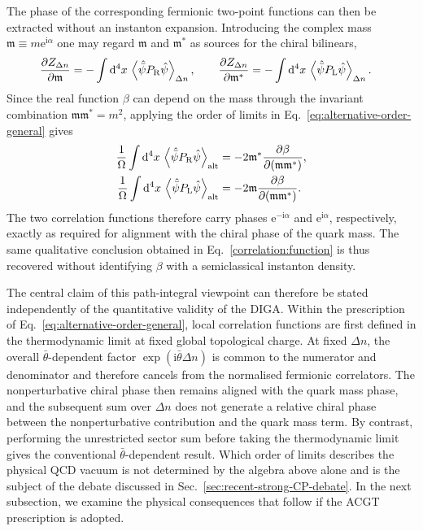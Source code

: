 \documentclass[review]{elsarticle}
\numberwithin{equation}{section}
\numberwithin{table}{section}
\numberwithin{figure}{section}
\def\d{\mathrm{d}}
\def\i{\mathrm{i}}
\def\e{\mathrm{e}}
\begin{document}
The phase of the corresponding fermionic two-point functions can then be extracted without an instanton expansion. Introducing the complex mass $\mathfrak m\equiv
m\e^{\i\alpha}$ one may regard $\mathfrak m$ and $\mathfrak m^*$ as sources for the chiral bilinears,
\begin{align}
    \frac{\partial Z_{\Delta n}}
         {\partial\mathfrak m}
    &=
    -\int\d^4x\,
    \left\langle
        \hat{\bar\psi}P_{\rm R}\hat\psi
    \right\rangle_{\Delta n},
    \qquad
    \frac{\partial Z_{\Delta n}}
         {\partial\mathfrak m^*}
    =
    -\int\d^4x\,
    \left\langle
        \hat{\bar\psi}P_{\rm L}\hat\psi
    \right\rangle_{\Delta n}.
    \label{eq:mass-source-chiral-condensates}
\end{align}
Since the real function $\beta$ can depend on the mass through the invariant combination $\mathfrak m\mathfrak m^*=m^2$, applying the order of limits in Eq.~\eqref{eq:alternative-order-general} gives~\cite{Ai:2020ptm}
\begin{align}
    \frac{1}{\Omega}
    \int\d^4x\,
    \left\langle
        \hat{\bar\psi}P_{\rm R}\hat\psi
    \right\rangle_{\rm alt}
    &=
    -2\mathfrak m^*
    \frac{\partial\beta}
         {\partial(\mathfrak m\mathfrak m^*)},
    \notag\\
    \frac{1}{\Omega}
    \int\d^4x\,
    \left\langle
        \hat{\bar\psi}P_{\rm L}\hat\psi
    \right\rangle_{\rm alt}
    &=
    -2\mathfrak m
    \frac{\partial\beta}
         {\partial(\mathfrak m\mathfrak m^*)}.
    \label{eq:general-chiral-condensate-alignment}
\end{align}
The two correlation functions therefore carry phases $\e^{-\i\alpha}$ and $\e^{\i\alpha}$, respectively, exactly as required for alignment with the chiral phase of the quark mass. The same qualitative conclusion obtained in Eq.~\eqref{correlation:function} is thus recovered without identifying $\beta$ with a semiclassical instanton density.

The central claim of this path-integral viewpoint can therefore be stated independently of the quantitative validity of the DIGA. Within the prescription of Eq.~\eqref{eq:alternative-order-general}, local correlation functions are first defined in the thermodynamic limit at fixed global topological charge. At fixed $\Delta n$, the overall $\bar\theta$-dependent factor $\exp(\i\bar\theta\Delta n)$ is common to the numerator and denominator and therefore cancels from the normalised fermionic correlators. The nonperturbative chiral phase then remains aligned with the quark mass phase, and the subsequent sum over $\Delta n$ does not generate a relative chiral phase between the nonperturbative contribution and the quark mass term. By contrast, performing the unrestricted sector sum before taking the thermodynamic limit gives the conventional $\bar\theta$-dependent result. Which order of limits describes the physical QCD vacuum is not determined by the algebra above alone and is the subject of the debate discussed in Sec.~\ref{sec:recent-strong-CP-debate}. In the next subsection, we examine the physical consequences that follow if the ACGT prescription is adopted.
\end{document}
